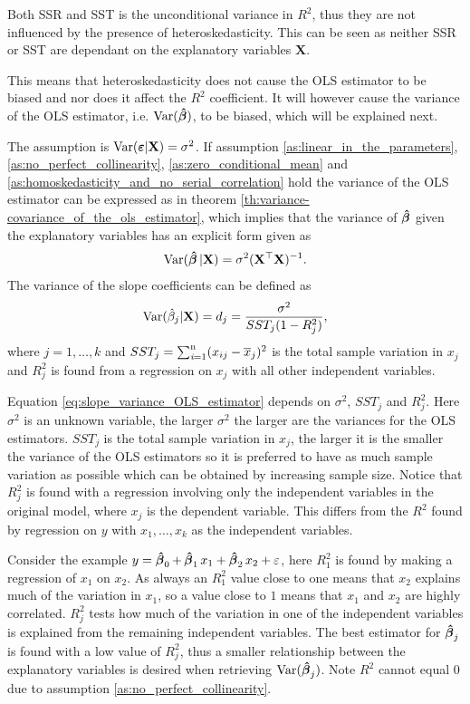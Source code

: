 Both SSR and SST is the unconditional variance in $R^2$, thus they are not influenced by the presence of heteroskedasticity. This can be seen as neither SSR or SST are dependant on the explanatory variables $\textbf{X}$.

This means that heteroskedasticity does not cause the OLS estimator to be biased and nor does it affect the $R^2$ coefficient. 
It will however cause the variance of the OLS estimator, i.e. $\operatorname{\text{Var}}(\operatorname{\boldsymbol{\hat{\beta}}})$, to be biased, which will be explained next.  

The \homo assumption is $\operatorname{\text{Var}}(\boldsymbol{\varepsilon} | \mathbf{X}) = \sigma^2$. If assumption \ref{as:linear_in_the_parameters}, \ref{as:no_perfect_collinearity}, \ref{as:zero_conditional_mean} and \ref{as:homoskedasticity_and_no_serial_correlation} hold the variance of the OLS estimator can be expressed as in theorem \ref{th:variance-covariance_of_the_ols_estimator}, which implies that the variance of $\operatorname{\boldsymbol{\hat{\beta}}}$ given the explanatory variables has an explicit form given as
\begin{align*}
    \operatorname{\text{Var}}(\operatorname{\boldsymbol{\hat{\beta}}} | \mathbf{X}) = \sigma^2(\mathbf{X}^\top\mathbf{X})^{-1}.
\end{align*}
The variance of the slope coefficients can be defined as
\begin{align}\label{eq:slope_variance_OLS_estimator}
    \operatorname{\text{Var}}(\hat{\beta}_j|\mathbf{X}) = d_j = \dfrac{\sigma^2}{SST_j(1- R_j^2)},
\end{align}
where $j = 1, \ldots, k$ and $SST_j = \operatorname{\sum_{\textit{i}=1}^n} (x_{ij} - \overline{x}_j)^2$ is the total sample variation in $x_j$ and $R^2_j$ is found from a regression on $x_j$ with all other independent variables. 

Equation \eqref{eq:slope_variance_OLS_estimator} depends on $\sigma^2$, $SST_j$ and $R^2_j$.
Here $\sigma^2$ is an unknown variable, the larger $\sigma^2$ the larger are the variances for the OLS estimators. $SST_j$ is the total sample variation in $x_j$, the larger it is the smaller the variance of the OLS estimators so it is preferred to have as much sample variation as possible which can be obtained by increasing sample size. 
Notice that $R^2_j$ is found with a regression involving only the independent variables in the original model, where $x_j$ is the dependent variable. 
This differs from the $R^2$ found by regression on $y$ with $x_1, \ldots, x_k$ as the independent variables. 

Consider the example $y = \operatorname{\boldsymbol{\hat{\beta}}}_0 + \operatorname{\boldsymbol{\hat{\beta}}}_1 x_1 + \operatorname{\boldsymbol{\hat{\beta}}}_2 x_2 + \varepsilon$, here $R^2_1$ is found by making a regression of $x_1$ on $x_2$. 
As always an $R^2_1$ value close to one means that $x_2$ explains much of the variation in $x_1$, so a value close to $1$ means that $x_1$ and $x_2$ are highly correlated.
$R^2_j$ tests how much of the variation in one of the independent variables is explained from the remaining independent variables.
The best estimator for $\operatorname{\boldsymbol{\hat{\beta}}}_j$ is found with a low value of $R^2_j$, thus a smaller relationship between the explanatory variables is desired when retrieving $\operatorname{\text{Var}}(\operatorname{\boldsymbol{\hat{\beta}}}_j)$. Note $R^2$ cannot equal $0$ due to assumption \ref{as:no_perfect_collinearity}. 

